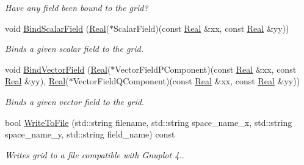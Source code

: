 \begin{DoxyCompactItemize}
\begin{DoxyCompactList}\small\item\em Have any field been bound to the grid? \end{DoxyCompactList}\item 
void \hyperlink{classmtk_1_1UniStgGrid2D_a5f9910ffb94e0314b16c026c4b5762ee}{Bind\+Scalar\+Field} (\hyperlink{group__c01-roots_gac080bbbf5cbb5502c9f00405f894857d}{Real}($\ast$Scalar\+Field)(const \hyperlink{group__c01-roots_gac080bbbf5cbb5502c9f00405f894857d}{Real} \&xx, const \hyperlink{group__c01-roots_gac080bbbf5cbb5502c9f00405f894857d}{Real} \&yy))
\begin{DoxyCompactList}\small\item\em Binds a given scalar field to the grid. \end{DoxyCompactList}\item 
void \hyperlink{classmtk_1_1UniStgGrid2D_ae274b24672e9bd6075bf38b015bd9083}{Bind\+Vector\+Field} (\hyperlink{group__c01-roots_gac080bbbf5cbb5502c9f00405f894857d}{Real}($\ast$Vector\+Field\+P\+Component)(const \hyperlink{group__c01-roots_gac080bbbf5cbb5502c9f00405f894857d}{Real} \&xx, const \hyperlink{group__c01-roots_gac080bbbf5cbb5502c9f00405f894857d}{Real} \&yy), \hyperlink{group__c01-roots_gac080bbbf5cbb5502c9f00405f894857d}{Real}($\ast$Vector\+Field\+Q\+Component)(const \hyperlink{group__c01-roots_gac080bbbf5cbb5502c9f00405f894857d}{Real} \&xx, const \hyperlink{group__c01-roots_gac080bbbf5cbb5502c9f00405f894857d}{Real} \&yy))
\begin{DoxyCompactList}\small\item\em Binds a given vector field to the grid. \end{DoxyCompactList}\item 
bool \hyperlink{classmtk_1_1UniStgGrid2D_a1787a79e4bcee6b89c681dc7e5e2d7bc}{Write\+To\+File} (std\+::string filename, std\+::string space\+\_\+name\+\_\+x, std\+::string space\+\_\+name\+\_\+y, std\+::string field\+\_\+name) const 
\begin{DoxyCompactList}\small\item\em Writes grid to a file compatible with Gnuplot 4.. \end{DoxyCompactList}\end{DoxyCompactItemize}
